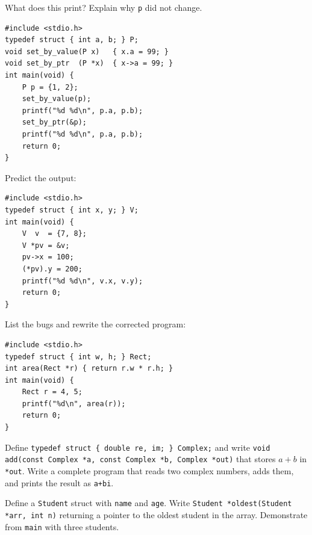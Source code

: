 \documentclass[11pt]{article}
\begin{document}
\takehomebanner

\begin{trace}
What does this print? Explain why \texttt{p} did not change.
\begin{lstlisting}
#include <stdio.h>
typedef struct { int a, b; } P;
void set_by_value(P x)   { x.a = 99; }
void set_by_ptr  (P *x)  { x->a = 99; }
int main(void) {
    P p = {1, 2};
    set_by_value(p);
    printf("%d %d\n", p.a, p.b);
    set_by_ptr(&p);
    printf("%d %d\n", p.a, p.b);
    return 0;
}
\end{lstlisting}
\end{trace}

\begin{trace}
Predict the output:
\begin{lstlisting}
#include <stdio.h>
typedef struct { int x, y; } V;
int main(void) {
    V  v  = {7, 8};
    V *pv = &v;
    pv->x = 100;
    (*pv).y = 200;
    printf("%d %d\n", v.x, v.y);
    return 0;
}
\end{lstlisting}
\end{trace}

\begin{bug}
List the bugs and rewrite the corrected program:
\begin{lstlisting}
#include <stdio.h>
typedef struct { int w, h; } Rect;
int area(Rect *r) { return r.w * r.h; }
int main(void) {
    Rect r = 4, 5;
    printf("%d\n", area(r));
    return 0;
}
\end{lstlisting}
\end{bug}

\begin{writecode}
Define \texttt{typedef struct \{ double re, im; \} Complex;} and write
\texttt{void add(const Complex *a, const Complex *b, Complex *out)} that stores
\(a + b\) in \texttt{*out}. Write a complete program that reads two complex numbers,
adds them, and prints the result as \texttt{a+bi}.
\end{writecode}

\begin{writecode}
Define a \texttt{Student} struct with \texttt{name} and \texttt{age}. Write
\texttt{Student *oldest(Student *arr, int n)} returning a pointer to the oldest
student in the array. Demonstrate from \texttt{main} with three students.
\end{writecode}
\end{document}
